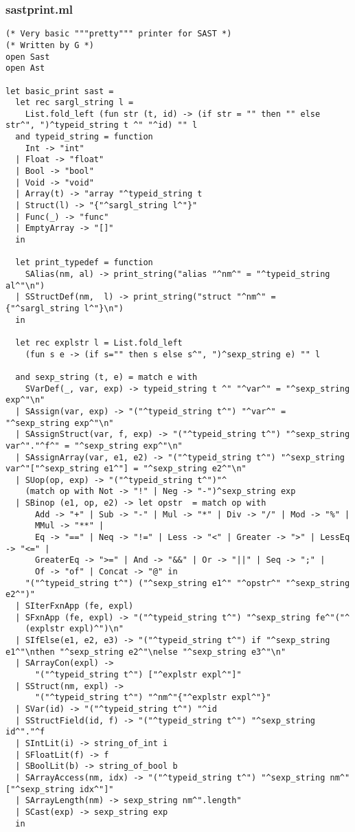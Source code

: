 \documentclass[main.tex]{subfiles}
\begin{document}
\subsubsection{sastprint.ml}
\begin{lstlisting}
(* Very basic """pretty""" printer for SAST *)
(* Written by G *)
open Sast
open Ast

let basic_print sast = 
  let rec sargl_string l =
    List.fold_left (fun str (t, id) -> (if str = "" then "" else str^", ")^typeid_string t ^" "^id) "" l
  and typeid_string = function
    Int -> "int"
  | Float -> "float"
  | Bool -> "bool"
  | Void -> "void"
  | Array(t) -> "array "^typeid_string t
  | Struct(l) -> "{"^sargl_string l^"}"
  | Func(_) -> "func"
  | EmptyArray -> "[]"
  in

  let print_typedef = function
    SAlias(nm, al) -> print_string("alias "^nm^" = "^typeid_string al^"\n")
  | SStructDef(nm,  l) -> print_string("struct "^nm^" = {"^sargl_string l^"}\n")
  in

  let rec explstr l = List.fold_left
    (fun s e -> (if s="" then s else s^", ")^sexp_string e) "" l

  and sexp_string (t, e) = match e with
    SVarDef(_, var, exp) -> typeid_string t ^" "^var^" = "^sexp_string exp^"\n"
  | SAssign(var, exp) -> "("^typeid_string t^") "^var^" = "^sexp_string exp^"\n"
  | SAssignStruct(var, f, exp) -> "("^typeid_string t^") "^sexp_string var^"."^f^" = "^sexp_string exp^"\n"
  | SAssignArray(var, e1, e2) -> "("^typeid_string t^") "^sexp_string var^"["^sexp_string e1^"] = "^sexp_string e2^"\n"
  | SUop(op, exp) -> "("^typeid_string t^")"^
    (match op with Not -> "!" | Neg -> "-")^sexp_string exp
  | SBinop (e1, op, e2) -> let opstr  = match op with
      Add -> "+" | Sub -> "-" | Mul -> "*" | Div -> "/" | Mod -> "%" |
      MMul -> "**" |
      Eq -> "==" | Neq -> "!=" | Less -> "<" | Greater -> ">" | LessEq -> "<=" |
      GreaterEq -> ">=" | And -> "&&" | Or -> "||" | Seq -> ";" |
      Of -> "of" | Concat -> "@" in
    "("^typeid_string t^") ("^sexp_string e1^" "^opstr^" "^sexp_string e2^")"
  | SIterFxnApp (fe, expl)
  | SFxnApp (fe, expl) -> "("^typeid_string t^") "^sexp_string fe^"("^
    (explstr expl)^")\n"
  | SIfElse(e1, e2, e3) -> "("^typeid_string t^") if "^sexp_string e1^"\nthen "^sexp_string e2^"\nelse "^sexp_string e3^"\n"
  | SArrayCon(expl) -> 
      "("^typeid_string t^") ["^explstr expl^"]"
  | SStruct(nm, expl) -> 
      "("^typeid_string t^") "^nm^"{"^explstr expl^"}"
  | SVar(id) -> "("^typeid_string t^") "^id
  | SStructField(id, f) -> "("^typeid_string t^") "^sexp_string id^"."^f
  | SIntLit(i) -> string_of_int i
  | SFloatLit(f) -> f
  | SBoolLit(b) -> string_of_bool b
  | SArrayAccess(nm, idx) -> "("^typeid_string t^") "^sexp_string nm^"["^sexp_string idx^"]"
  | SArrayLength(nm) -> sexp_string nm^".length"
  | SCast(exp) -> sexp_string exp
  in


\end{lstlisting}
\end{document}
